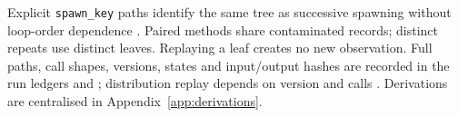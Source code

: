 Explicit \texttt{spawn\_key} paths identify
the same tree as successive spawning without loop-order dependence
 \citep{numpy21parallel,numpy21seedsequence}. Paired methods share
contaminated records; distinct repeats use distinct leaves. Replaying
a leaf creates no new observation. Full paths, call shapes, versions,
states and input/output hashes are recorded in the run ledgers and
 ; distribution replay depends
on version and calls \citep{numpy21randomcompatibility}.
Derivations are centralised in Appendix~\ref{app:derivations}.
